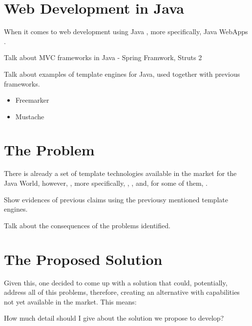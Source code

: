 \section{Web Development in Java}

When it comes to web development using Java \cite{Bloch2008EffectiveSeries}, more specifically, Java WebApps \cite{Williams2014ProfessionalApplications}.

\begin{expand}
    Talk about MVC frameworks in Java - Spring Framwork, Struts 2
\end{expand}

\begin{expand}
    Talk about examples of template engines for Java, used together with previous frameworks.
    \begin{itemize}
        \item Freemarker \cite{Forsythe2013InstantFreemarker}
        \item Mustache
        \cite{Forsythe2013InstantFreemarker}
    \end{itemize}
\end{expand}

\section{The Problem}

There is already a set of template technologies available in the market for the Java World, however, , more specifically, , ,  and, for some of them, . 

\begin{expand}
    Show evidences of previous claims using the previousy mentioned template engines.
\end{expand}

\begin{expand}
    Talk about the consequences of the problems identified.
\end{expand}

\section{The Proposed Solution}

Given this, one decided to come up with a solution that could, potentially, address all of this problems, therefore, creating an alternative with capabilities not yet available in the market. This means:


\begin{orientador}
    How much detail should I give about the solution we propose to develop?
\end{orientador}